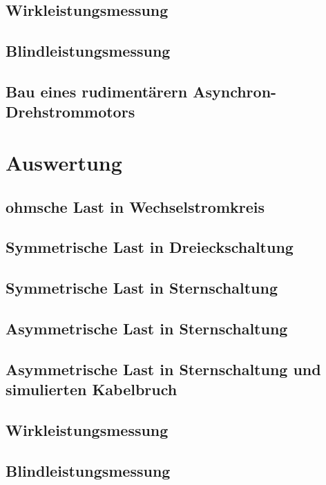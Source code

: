 \documentclass[12pt,english,ngerman]{scrartcl}
\begin{document}
\subsection{Wirkleistungsmessung}


\subsection{Blindleistungsmessung}


\subsection{Bau eines rudimentärern Asynchron-Drehstrommotors}


\section{Auswertung}
\label{sec:auswertung}

\subsection{ohmsche Last in Wechselstromkreis}


\subsection{Symmetrische Last in Dreieckschaltung}


\subsection{Symmetrische Last in Sternschaltung}


\subsection{Asymmetrische Last in Sternschaltung}


\subsection{Asymmetrische Last in Sternschaltung und simulierten Kabelbruch}


\subsection{Wirkleistungsmessung}


\subsection{Blindleistungsmessung}
\end{document}
